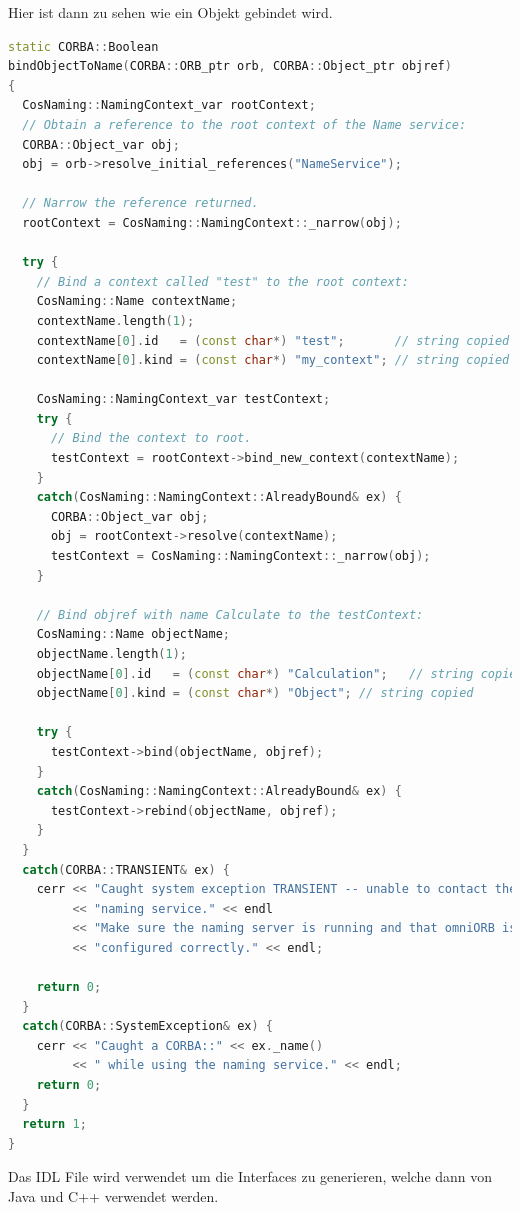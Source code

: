 Hier ist dann zu sehen wie ein Objekt gebindet wird.
\begin{lstlisting}[language=C++, caption=server.cc main Klasse welches die ORB und POA Objekte erstellt]
static CORBA::Boolean
bindObjectToName(CORBA::ORB_ptr orb, CORBA::Object_ptr objref)
{
  CosNaming::NamingContext_var rootContext;
  // Obtain a reference to the root context of the Name service:
  CORBA::Object_var obj;
  obj = orb->resolve_initial_references("NameService");

  // Narrow the reference returned.
  rootContext = CosNaming::NamingContext::_narrow(obj);

  try {
    // Bind a context called "test" to the root context:
    CosNaming::Name contextName;
    contextName.length(1);
    contextName[0].id   = (const char*) "test";       // string copied
    contextName[0].kind = (const char*) "my_context"; // string copied

    CosNaming::NamingContext_var testContext;
    try {
      // Bind the context to root.
      testContext = rootContext->bind_new_context(contextName);
    }
    catch(CosNaming::NamingContext::AlreadyBound& ex) {
      CORBA::Object_var obj;
      obj = rootContext->resolve(contextName);
      testContext = CosNaming::NamingContext::_narrow(obj);
    }

    // Bind objref with name Calculate to the testContext:
    CosNaming::Name objectName;
    objectName.length(1);
    objectName[0].id   = (const char*) "Calculation";   // string copied
    objectName[0].kind = (const char*) "Object"; // string copied

    try {
      testContext->bind(objectName, objref);
    }
    catch(CosNaming::NamingContext::AlreadyBound& ex) {
      testContext->rebind(objectName, objref);
    }
  }
  catch(CORBA::TRANSIENT& ex) {
    cerr << "Caught system exception TRANSIENT -- unable to contact the "
         << "naming service." << endl
         << "Make sure the naming server is running and that omniORB is "
         << "configured correctly." << endl;

    return 0;
  }
  catch(CORBA::SystemException& ex) {
    cerr << "Caught a CORBA::" << ex._name()
         << " while using the naming service." << endl;
    return 0;
  }
  return 1;
}

\end{lstlisting}

\clearpage

Das IDL File wird verwendet um die Interfaces zu generieren, welche dann von Java und C++ verwendet werden.

